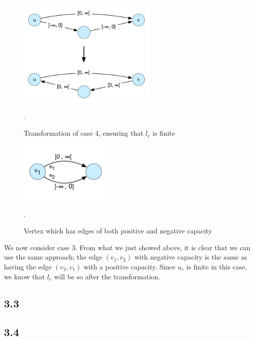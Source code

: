 \documentclass[12pt]{article}
\begin{document}
\begin{figure}[h]
  \centering
    \includegraphics[width=0.6\textwidth]{figures/e3_2}
  \caption{Transformation of case 4, ensuring that $l_e$ is finite}.
  \label{fig:e3_2}
\end{figure}

\begin{figure}[h]
  \centering
    \includegraphics[width=0.4\textwidth]{figures/e3_2_b}
  \caption{Vertex which has edges of both positive and negative capacity}.
  \label{fig:e3_2_b}
\end{figure}

We now consider case 3. From what we just showed above, it is clear that we can use the same approach; the edge $(v_1, v_2)$ with negative capacity is the same as having the edge $(v_2, v_1)$ with a positive capacity. Since $u_e$ is finite in this case, we know that $l_e$ will be so after the transformation.

\subsection{3.3}


\subsection{3.4}
\end{document}
